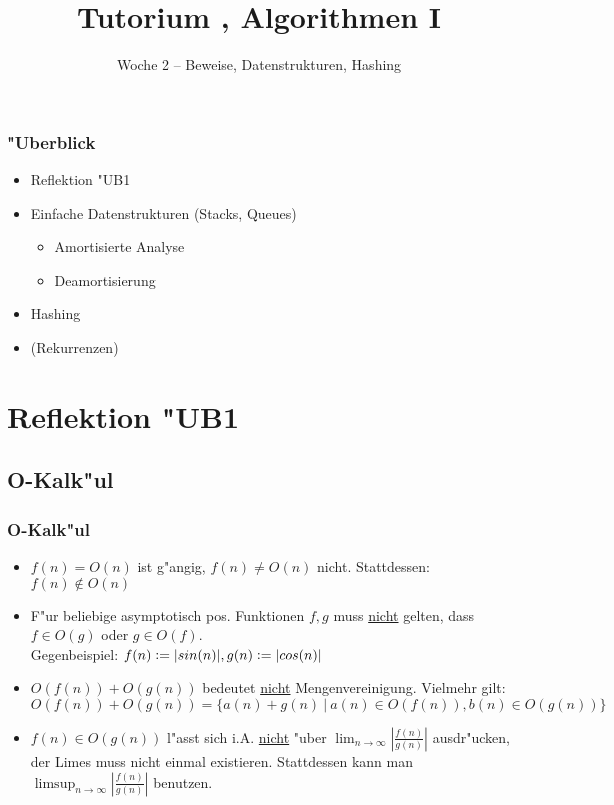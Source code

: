 

\title[Tutorium Algorithmen I]{Tutorium \tutNo, Algorithmen I}
\subtitle{Woche 2 -- Beweise, Datenstrukturen, Hashing}



\begin{frame}
  \titlepage
\end{frame}

\begin{frame}
  \frametitle{"Uberblick}
  \begin{itemize}
  \item Reflektion "UB1
  \item Einfache Datenstrukturen (Stacks, Queues)
    \begin{itemize}
    \item Amortisierte Analyse
    \item Deamortisierung
    \end{itemize}
  \item Hashing
  \item (Rekurrenzen)
  \end{itemize}
\end{frame}

\section{Reflektion "UB1}
\subsection{O-Kalk"ul}
\begin{frame}
  \frametitle{O-Kalk"ul}
  \begin{itemize}
  \item $f(n) = O(n)$ ist g"angig, $f(n) \neq O(n)$ nicht. Stattdessen: $f(n) \not \in O(n)$
  \item F"ur beliebige asymptotisch pos. Funktionen $f, g$ muss \uline{nicht} gelten,
        dass $f \in O(g)$ oder $g \in O(f)$. \\
        Gegenbeispiel: $f(n) \vcentcolon= |sin(n)|, g(n) \vcentcolon= |cos(n)|$
  \item $O(f(n)) + O(g(n))$ bedeutet \uline{nicht} Mengenvereinigung. Vielmehr gilt:
        $O(f(n)) + O(g(n)) = \{ a(n) + g(n) \ |\  a(n) \in O(f(n)), b(n) \in O(g(n)) \}$
  \item $f(n) \in O(g(n))$ l"asst sich i.A. \uline{nicht} "uber
        $\lim_{n \rightarrow \infty} |\frac{f(n)}{g(n)}|$
        ausdr"ucken, der Limes muss nicht einmal existieren.
        Stattdessen kann man $\limsup_{n \rightarrow \infty} |\frac{f(n)}{g(n)}|$ benutzen.
  \end{itemize}
\end{frame}

